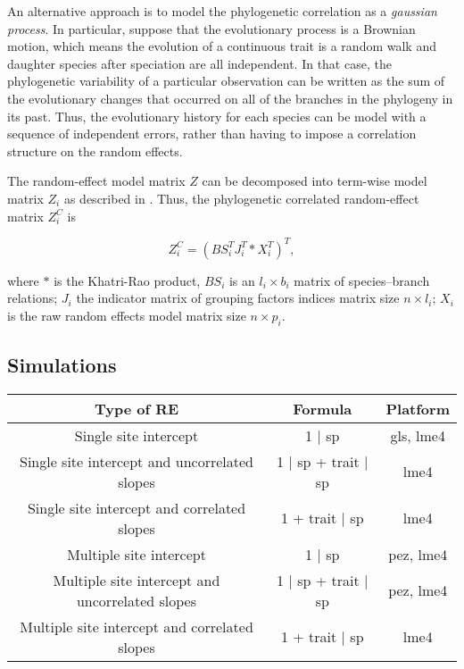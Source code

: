 An alternative approach is to model the phylogenetic correlation as a \textit{gaussian process}. 
In particular, suppose that the evolutionary process is a Brownian motion, which means the evolution of a continuous trait is a random walk and daughter species after speciation are all independent.  
In that case, the phylogenetic variability of a particular observation can be written as the sum of the evolutionary changes that occurred on all of the branches in the phylogeny in its past. 
Thus, the evolutionary history for each species can be model with a sequence of independent errors, rather than having to impose a correlation structure on the random effects. 


The random-effect model matrix $Z$ can be decomposed into term-wise model matrix $Z_{i}$ as described in .
Thus, the phylogenetic correlated random-effect matrix $Z^{C}_{i}$ is

\begin{equation}
Z^{C}_{i} = (BS^{T}_{i}J^{T}_{i} \ast X^{T}_{i})^{T},
\end{equation}


where $\ast$ is the Khatri-Rao product, $BS_{i}$ is an $l_{i} \times b_{i}$ matrix of species--branch relations; $J_{i}$ the indicator matrix of grouping factors indices matrix size $n \times l_{i}$; $X_{i}$ is the raw random effects model matrix size $n \times p_{i}$.



\subsection{Simulations}

\begin{tabular}{|c|c|c|}
\hline
Type of RE	& Formula	& Platform	\\
\hline

Single site intercept	  &	1 $\mid$ sp	& gls, lme4 \\
Single site intercept and uncorrelated slopes		&  1 $\mid$ sp + trait $\mid$ sp		& lme4 \\
Single site intercept and correlated slopes 			& 1 + trait $\mid$ sp					& lme4 \\
\hline
Multiple site intercept 									&  1 $\mid$ sp 						& pez, lme4 \\
Multiple site intercept and uncorrelated slopes 	&  1 $\mid$ sp + trait $\mid$ sp 		& pez, lme4 \\
Multiple site intercept and correlated slopes 	& 	1 + trait $\mid$ sp					& lme4 \\
\hline
\end{tabular}

